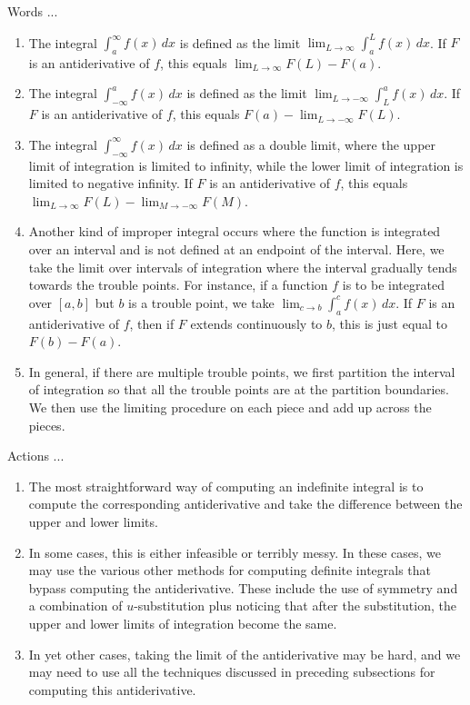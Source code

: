 \documentclass[10pt]{amsart}
\begin{document}
Words ...

\begin{enumerate}
\item The integral $\int_a^\infty f(x) \, dx$ is defined as the limit
  $\lim_{L \to \infty} \int_a^L f(x) \, dx$. If $F$ is an
  antiderivative of $f$, this equals $\lim_{L \to \infty} F(L) - F(a)$.
\item The integral $\int_{-\infty}^a f(x) \, dx$ is defined as the
  limit $\lim_{L \to -\infty} \int_L^a f(x) \, dx$. If $F$ is an
  antiderivative of $f$, this equals $F(a) - \lim_{L \to -\infty} F(L)$.
\item The integral $\int_{-\infty}^\infty f(x) \, dx$ is defined as a
  double limit, where the upper limit of integration is limited to
  infinity, while the lower limit of integration is limited to
  negative infinity. If $F$ is an antiderivative of $f$, this equals
  $\lim_{L \to \infty} F(L) - \lim_{M \to -\infty} F(M)$.
\item Another kind of improper integral occurs where the function is
  integrated over an interval and is not defined at an endpoint of the
  interval. Here, we take the limit over intervals of integration
  where the interval gradually tends towards the trouble points. For
  instance, if a function $f$ is to be integrated over $[a,b]$ but $b$
  is a trouble point, we take $\lim_{c \to b} \int_a^c f(x) \, dx$. If
  $F$ is an antiderivative of $f$, then if $F$ extends continuously to
  $b$, this is just equal to $F(b) - F(a)$.
\item In general, if there are multiple trouble points, we first
  partition the interval of integration so that all the trouble points
  are at the partition boundaries. We then use the limiting procedure
  on each piece and add up across the pieces.
\end{enumerate}

Actions ...

\begin{enumerate}
\item The most straightforward way of computing an indefinite integral
  is to compute the corresponding antiderivative and take the
  difference between the upper and lower limits.
\item In some cases, this is either infeasible or terribly messy. In
  these cases, we may use the various other methods for computing
  definite integrals that bypass computing the antiderivative. These
  include the use of symmetry and a combination of $u$-substitution
  plus noticing that after the substitution, the upper and lower
  limits of integration become the same.
\item In yet other cases, taking the limit of the antiderivative may
  be hard, and we may need to use all the techniques discussed in
  preceding subsections for computing this antiderivative.
\end{enumerate}
\end{document}
